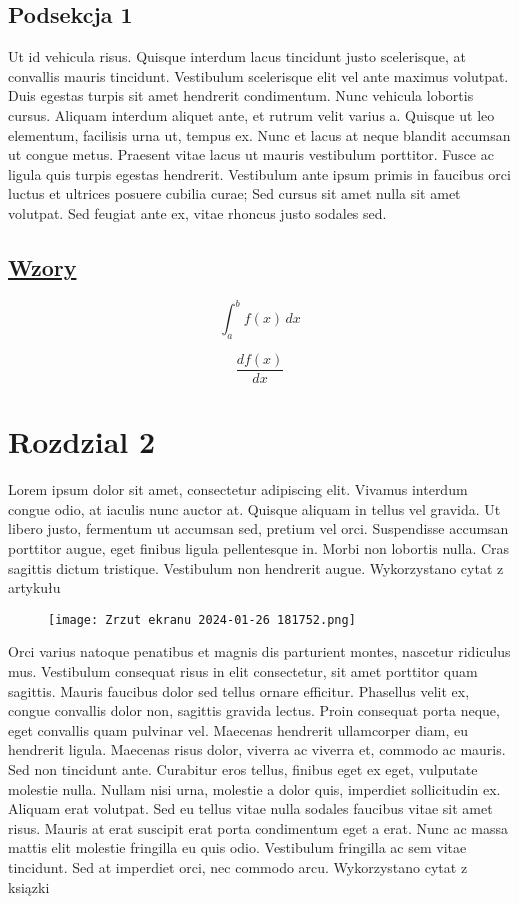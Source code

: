 \documentclass[12pt]{article}
\begin{document}
\subsection*{Podsekcja 1}
Ut id vehicula risus. Quisque interdum lacus tincidunt justo scelerisque, at convallis mauris tincidunt. Vestibulum scelerisque elit vel ante maximus volutpat. Duis egestas turpis sit amet hendrerit condimentum. Nunc vehicula lobortis cursus. Aliquam interdum aliquet ante, et rutrum velit varius a. Quisque ut leo elementum, facilisis urna ut, tempus ex. Nunc et lacus at neque blandit accumsan ut congue metus. Praesent vitae lacus ut mauris vestibulum porttitor. Fusce ac ligula quis turpis egestas hendrerit. Vestibulum ante ipsum primis in faucibus orci luctus et ultrices posuere cubilia curae; Sed cursus sit amet nulla sit amet volutpat. Sed feugiat ante ex, vitae rhoncus justo sodales sed. 
\subsection*{\underline{Wzory}}

\[
\int_{a}^{b} f(x) \, dx
\]

\[
\frac{df(x)}{dx}
\]

\section*{Rozdzial 2}
Lorem ipsum dolor sit amet, consectetur adipiscing elit. Vivamus interdum congue odio, at iaculis nunc auctor at. Quisque aliquam in tellus vel gravida. Ut libero justo, fermentum ut accumsan sed, pretium vel orci. Suspendisse accumsan porttitor augue, eget finibus ligula pellentesque in. Morbi non lobortis nulla. Cras sagittis dictum tristique. Vestibulum non hendrerit augue. 
Wykorzystano cytat z artykułu \cite{autor1}
\begin{figure}
    \centering
    \texttt{[image: Zrzut ekranu 2024-01-26 181752.png]}
    \label{rysunek}
\end{figure}

Orci varius natoque penatibus et magnis dis parturient montes, nascetur ridiculus mus. Vestibulum consequat risus in elit consectetur, sit amet porttitor quam sagittis. Mauris faucibus dolor sed tellus ornare efficitur. Phasellus velit ex, congue convallis dolor non, sagittis gravida lectus. Proin consequat porta neque, eget convallis quam pulvinar vel. Maecenas hendrerit ullamcorper diam, eu hendrerit ligula. Maecenas risus dolor, viverra ac viverra et, commodo ac mauris. Sed non tincidunt ante. Curabitur eros tellus, finibus eget ex eget, vulputate molestie nulla. Nullam nisi urna, molestie a dolor quis, imperdiet sollicitudin ex. Aliquam erat volutpat. Sed eu tellus vitae nulla sodales faucibus vitae sit amet risus. Mauris at erat suscipit erat porta condimentum eget a erat. Nunc ac massa mattis elit molestie fringilla eu quis odio. Vestibulum fringilla ac sem vitae tincidunt. Sed at imperdiet orci, nec commodo arcu. 
Wykorzystano cytat z ksiązki \cite{autor2}
\end{document}
